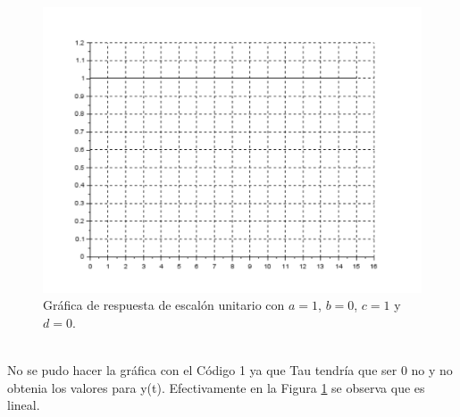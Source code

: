 \documentclass[12pt,a4paper]{article}
\begin{document}
\begin{figure}[h!] 
\centering
\includegraphics[scale=0.4]{WiIgualWo_yo.pdf}
\caption{Gráfica de respuesta de escalón unitario con $a = 1$, $b = 0$, $c = 1$ y $d = 0$.}
\label{Figura5}
\end{figure}\\
No se pudo hacer la gráfica con el Código 1 ya que Tau tendría que ser 0 no y no obtenia los valores para y(t). Efectivamente en la Figura \ref{Figura5} se observa que es lineal.
\end{document}
